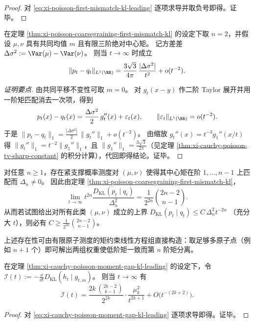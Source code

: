 \begin{proof}
对 \eqref{eq:xi-poisson-first-mismatch-kl-leading} 逐项求导并取负号即得。证毕。
\end{proof}

\begin{proposition}\label{prop:xi-poisson-variance-mismatch-tv-leading}
在定理 \ref{thm:xi-poisson-coarsegraining-first-mismatch-kl} 的设定下取 \(n=2\)，并假设 \(\mu,\nu\) 具有共同均值 \(m\) 且有限三阶绝对中心矩。
记方差差 \(\Delta\sigma^2:=\Var(\mu)-\Var(\nu)\)。
则当 \(t\to\infty\) 时成立
\[
\|p_t-q_t\|_{L^1(\RR)}
=\frac{3\sqrt3}{4\pi}\,\frac{|\Delta\sigma^2|}{t^2}+o(t^{-2}).
\]
\end{proposition}

\begin{proof}[证明要点]
由共同平移不变性可取 \(m=0\)。
对 \(g_t(x-y)\) 作二阶 Taylor 展开并用一阶矩匹配消去一次项，得到
\[
p_t(x)-q_t(x)=\frac{\Delta\sigma^2}{2}\,g_t''(x)+\varepsilon_t(x),
\qquad \|\varepsilon_t\|_{L^1(\RR)}=o(t^{-2}).
\]
于是
\(
\|p_t-q_t\|_{1}=\frac{|\Delta\sigma^2|}{2}\,\|g_t''\|_{1}+o(t^{-2})
\)。
由缩放 \(g_t''(x)=t^{-3}g_1''(x/t)\) 得 \(\|g_t''\|_1=t^{-2}\|g_1''\|_1\)，且 \(\|g_1''\|_1=\frac{3\sqrt3}{2\pi}\)（见定理 \ref{thm:xi-cauchy-poisson-tv-sharp-constant} 的积分计算），代回即得结论。证毕。
\end{proof}

\begin{remark}[常数的最优性与构造性例子]\label{rem:xi-poisson-first-mismatch-optimality}
对任意 \(n\ge 1\)，存在紧支撑概率测度对 \((\mu,\nu)\) 使得其中心矩在阶 \(1,\dots,n-1\) 上匹配而 \(\Delta_n\neq 0\)。
因此由定理 \ref{thm:xi-poisson-coarsegraining-first-mismatch-kl}，
\[
\lim_{t\to\infty}t^{2n}\frac{D_{\mathrm{KL}}(p_t\mid q_t)}{\Delta_n^2}
=\frac{1}{2^{2n}}\binom{2n-2}{n-1}.
\]
从而若试图给出对所有此类 \((\mu,\nu)\) 成立的上界
\(
D_{\mathrm{KL}}(p_t\mid q_t)\le C\,\Delta_n^2 t^{-2n}
\)
（充分大 \(t\)），则必有
\(
C\ge \frac{1}{2^{2n}}\binom{2n-2}{n-1}
\)。
\par
上述存在性可由有限原子测度的矩约束线性方程组直接构造：取足够多原子点（例如 \(n+1\) 个）即可解出两组权重使低阶矩一致而第 \(n\) 阶矩分离。
\end{remark}

\begin{corollary}[缺口阶的耗散尾部常数]\label{cor:xi-cauchy-poisson-moment-gap-dissipation}
在定理 \ref{thm:xi-cauchy-poisson-moment-gap-kl-leading} 的设定下，令
\(
\mathcal I(t):=-\frac{\dd}{\dd t}D_{\mathrm{KL}}(h_t\mid g_{t,m})
\)。
则当 \(t\to\infty\) 有
\begin{equation}\label{eq:xi-cauchy-poisson-moment-gap-dissipation}
\boxed{\;
\mathcal I(t)
=\frac{2k\,\binom{2k-2}{k-1}}{2^{2k}}\cdot\frac{\mu_k^2}{t^{2k+1}}
+O\!\bigl(t^{-(2k+2)}\bigr).\;}
\end{equation}
\end{corollary}

\begin{proof}
对 \eqref{eq:xi-cauchy-poisson-moment-gap-kl-leading} 逐项求导即得。证毕。
\end{proof}

\endinput
